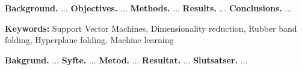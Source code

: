 \documentclass[a4paper,twoside]{bth}
\begin{document}
\abstract
\noindent
\textbf{Background.} ... \newline
\textbf{Objectives.} ... \newline
\textbf{Methods.} ... \newline
\textbf{Results.} ... \newline
\textbf{Conclusions.} ... \newline

\vspace{1cm}
\noindent
\textbf{Keywords:} Support Vector Machines, Dimensionality reduction, Rubber band folding, Hyperplane folding, Machine learning

\cleardoublepage


\sammanfattning
{}
\noindent
\textbf{Bakgrund.} ... \newline
\textbf{Syfte.} ... \newline
\textbf{Metod.} ... \newline
\textbf{Resultat.} ... \newline
\textbf{Slutsatser.} ...
\end{document}
